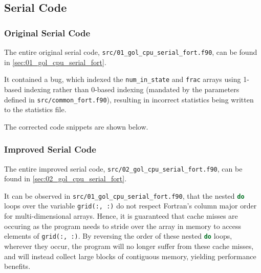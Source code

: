 \documentclass[]{article}
\begin{document}


\subsection{Serial Code}
\label{sec:serial-code}

\subsubsection{Original Serial Code}
\label{sec:original-serial-code}

The entire original serial code,
\lstinline[style=ff]{src/01_gol_cpu_serial_fort.f90}, can be found in
\autoref{sec:01_gol_cpu_serial_fort}.

It contained a bug, which indexed the \lstinline{num_in_state} and
\lstinline{frac} arrays using 1-based indexing rather than 0-based indexing
(mandated by the parameters defined in
\lstinline[style=ff]{src/common_fort.f90}), resulting in incorrect statistics
being written to the statistics file.

The corrected code snippets are shown below.





\subsubsection{Improved Serial Code}
\label{sec:improved-serial-code}

The entire improved serial code,
\lstinline[style=ff]{src/02_gol_cpu_serial_fort.f90}, can be found in
\autoref{sec:02_gol_cpu_serial_fort}.

It can be observed in \lstinline[style=ff]{src/01_gol_cpu_serial_fort.f90},
that the nested \lstinline[language=Fortran]{do} loops over the variable
\lstinline[language=Fortran]{grid(:, :)} do not respect Fortran's column major
order for multi-dimensional arrays.
Hence, it is guaranteed that cache misses are occuring as the program needs to
stride over the array in memory to access elements of
\lstinline[language=Fortran]{grid(:, :)}.
By reversing the order of these nested \lstinline[language=Fortran]{do} loops,
wherever they occur, the program will no longer suffer from these cache misses,
and will instead collect large blocks of contiguous memory, yielding performance
benefits.
\end{document}
